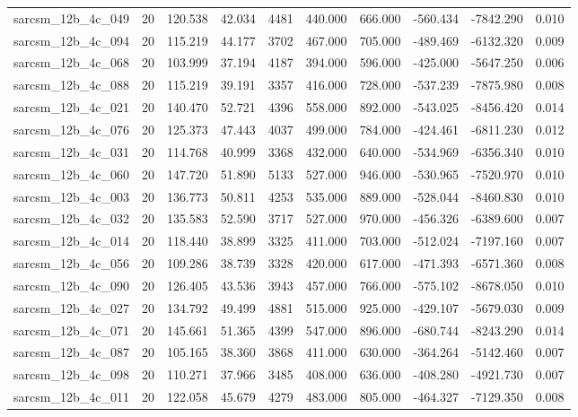 \begin{tabular}{lrrrrrrrrr}
sarcsm\_12b\_4c\_049 & 20 & 120.538 & 42.034 & 4481 & 440.000 & 666.000 & -560.434 & -7842.290 & 0.010 \\
sarcsm\_12b\_4c\_094 & 20 & 115.219 & 44.177 & 3702 & 467.000 & 705.000 & -489.469 & -6132.320 & 0.009 \\
sarcsm\_12b\_4c\_068 & 20 & 103.999 & 37.194 & 4187 & 394.000 & 596.000 & -425.000 & -5647.250 & 0.006 \\
sarcsm\_12b\_4c\_088 & 20 & 115.219 & 39.191 & 3357 & 416.000 & 728.000 & -537.239 & -7875.980 & 0.008 \\
sarcsm\_12b\_4c\_021 & 20 & 140.470 & 52.721 & 4396 & 558.000 & 892.000 & -543.025 & -8456.420 & 0.014 \\
sarcsm\_12b\_4c\_076 & 20 & 125.373 & 47.443 & 4037 & 499.000 & 784.000 & -424.461 & -6811.230 & 0.012 \\
sarcsm\_12b\_4c\_031 & 20 & 114.768 & 40.999 & 3368 & 432.000 & 640.000 & -534.969 & -6356.340 & 0.010 \\
sarcsm\_12b\_4c\_060 & 20 & 147.720 & 51.890 & 5133 & 527.000 & 946.000 & -530.965 & -7520.970 & 0.010 \\
sarcsm\_12b\_4c\_003 & 20 & 136.773 & 50.811 & 4253 & 535.000 & 889.000 & -528.044 & -8460.830 & 0.010 \\
sarcsm\_12b\_4c\_032 & 20 & 135.583 & 52.590 & 3717 & 527.000 & 970.000 & -456.326 & -6389.600 & 0.007 \\
sarcsm\_12b\_4c\_014 & 20 & 118.440 & 38.899 & 3325 & 411.000 & 703.000 & -512.024 & -7197.160 & 0.007 \\
sarcsm\_12b\_4c\_056 & 20 & 109.286 & 38.739 & 3328 & 420.000 & 617.000 & -471.393 & -6571.360 & 0.008 \\
sarcsm\_12b\_4c\_090 & 20 & 126.405 & 43.536 & 3943 & 457.000 & 766.000 & -575.102 & -8678.050 & 0.010 \\
sarcsm\_12b\_4c\_027 & 20 & 134.792 & 49.499 & 4881 & 515.000 & 925.000 & -429.107 & -5679.030 & 0.009 \\
sarcsm\_12b\_4c\_071 & 20 & 145.661 & 51.365 & 4399 & 547.000 & 896.000 & -680.744 & -8243.290 & 0.014 \\
sarcsm\_12b\_4c\_087 & 20 & 105.165 & 38.360 & 3868 & 411.000 & 630.000 & -364.264 & -5142.460 & 0.007 \\
sarcsm\_12b\_4c\_098 & 20 & 110.271 & 37.966 & 3485 & 408.000 & 636.000 & -408.280 & -4921.730 & 0.007 \\
sarcsm\_12b\_4c\_011 & 20 & 122.058 & 45.679 & 4279 & 483.000 & 805.000 & -464.327 & -7129.350 & 0.008 \\

\end{tabular}
